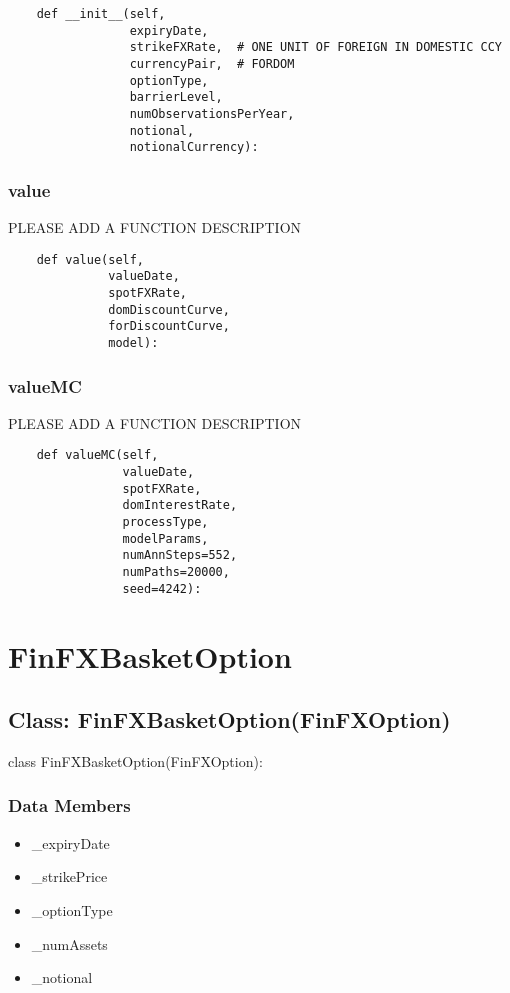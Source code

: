 \documentclass[twoside,11pt]{book}
\begin{document}
\begin{lstlisting}
    def __init__(self,
                 expiryDate,
                 strikeFXRate,  # ONE UNIT OF FOREIGN IN DOMESTIC CCY
                 currencyPair,  # FORDOM
                 optionType,
                 barrierLevel,
                 numObservationsPerYear,
                 notional,
                 notionalCurrency):
\end{lstlisting}

\subsubsection*{{\bf value}}
PLEASE ADD A FUNCTION DESCRIPTION

\begin{lstlisting}
    def value(self,
              valueDate,
              spotFXRate,
              domDiscountCurve,
              forDiscountCurve,
              model):
\end{lstlisting}

\subsubsection*{{\bf valueMC}}
PLEASE ADD A FUNCTION DESCRIPTION

\begin{lstlisting}
    def valueMC(self,
                valueDate,
                spotFXRate,
                domInterestRate,
                processType,
                modelParams,
                numAnnSteps=552,
                numPaths=20000,
                seed=4242):
\end{lstlisting}

\newpage
\section{FinFXBasketOption}

\subsection*{Class: FinFXBasketOption(FinFXOption)}
class FinFXBasketOption(FinFXOption): 

\subsubsection*{Data Members}
\begin{itemize}
\item{\_expiryDate}
\item{\_strikePrice}
\item{\_optionType}
\item{\_numAssets}
\item{\_notional}
\end{itemize}
\end{document}
